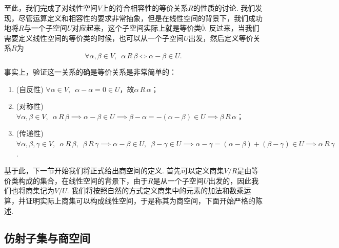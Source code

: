 至此，我们完成了对线性空间$V$上的符合相容性的等价关系$R$的性质的讨论. 我们发现，尽管运算定义和相容性的要求非常抽象，但是在线性空间的背景下，我们成功地将$R$与一个子空间$U$对应起来，这个子空间实际上就是等价类$\overline{0}$. 反过来，当我们需要定义线性空间的等价类的时候，也可以从一个子空间$U$出发，然后定义等价关系$R$为
\begin{equation} \label{eq:10:线性空间等价关系}
    \forall\alpha,\beta\in V,\enspace\alpha\,R\,\beta\iff \alpha-\beta\in U.
\end{equation}

事实上，验证这一关系的确是等价关系是非常简单的：
\begin{enumerate}
    \item (自反性) $\forall \alpha\in V,\enspace\alpha-\alpha=0\in U$，故$\alpha\,R\,\alpha$；

    \item (对称性) $\forall \alpha,\beta\in V,\enspace\alpha\,R\,\beta\implies \alpha-\beta\in U\implies \beta-\alpha=-(\alpha-\beta)\in U\implies \beta\,R\,\alpha$；

    \item (传递性) $\forall \alpha,\beta,\gamma\in V,\enspace\alpha\,R\,\beta,\enspace\beta\,R\,\gamma\implies \alpha-\beta\in U,\enspace\beta-\gamma\in U\implies \alpha-\gamma=(\alpha-\beta)+(\beta-\gamma)\in U\implies \alpha\,R\,\gamma$.
\end{enumerate}

基于此，下一节开始我们将正式给出商空间的定义. 首先可以定义商集$V/R$是由等价类构成的集合，在线性空间的背景下，由于$R$是从一个子空间$U$出发的，因此我们也将商集记为$V/U$. 我们将按照自然的方式定义商集中的元素的加法和数乘运算，并证明实际上商集可以构成线性空间，于是称其为商空间，下面开始严格的陈述.

\subsection{仿射子集与商空间}

